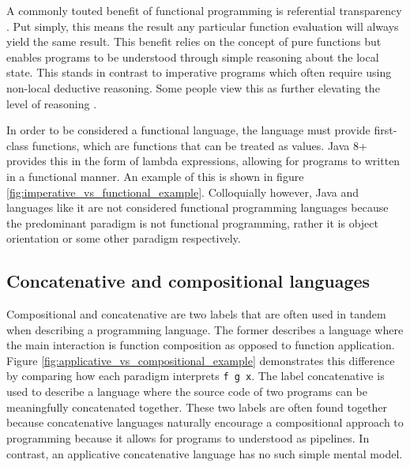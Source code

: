 A commonly touted benefit of functional programming is referential transparency \cite{FunctionalProgrammingHaskellWiki2019} \cite{thompson2011haskell}. Put simply, this means the result any particular function evaluation will always yield the same result. This benefit relies on the concept of pure functions but enables programs to be understood through simple reasoning about the local state. This stands in contrast to imperative programs which often require using non-local deductive reasoning. Some people view this as further elevating the level of reasoning \cite{thompson2011haskell}.


In order to be considered a functional language, the language must provide first-class functions, which are functions that can be treated as values. Java 8+ provides this in the form of lambda expressions, allowing for programs to written in a functional manner. An example of this is shown in figure \ref{fig:imperative_vs_functional_example}. Colloquially however, Java and languages like it are not considered functional programming languages because the predominant paradigm is not functional programming, rather it is object orientation or some other paradigm respectively.


\subsection*{Concatenative and compositional languages} 
Compositional and concatenative are two labels that are often used in tandem when describing a programming language. The former describes a language where the main interaction is function composition as opposed to function application. Figure \ref{fig:applicative_vs_compositional_example} demonstrates this difference by comparing how each paradigm interprets \lstinline{f g x}. The label concatenative is used to describe a language where the source code of two programs can be meaningfully concatenated together. These two labels are often found together because concatenative languages naturally encourage a compositional approach to programming because it allows for programs to understood as pipelines. In contrast, an applicative concatenative language has no such simple mental model.





